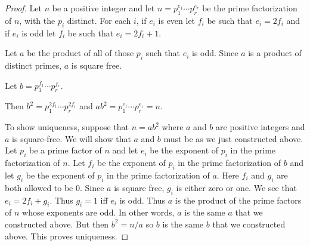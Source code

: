 \documentclass[oneside,12pt]{amsart}
\begin{document}
\begin{proof}
Let $n$ be a positive integer and let $n=p_1^{e_1}\cdots p_r^{e_r}$
be the prime factorization of $n$, with the $p_i$ distinct. For each $i$,
if $e_i$ is even let $f_i$ be such that $e_i=2f_i$ and if $e_i$ is odd
let $f_i$ be such that $e_i=2f_i + 1$.

Let $a$ be the product of all of those $p_i$ such that $e_i$ is odd. Since
$a$ is a product of distinct primes, $a$ is square free.

Let $b=p_1^{f_1}\cdots p_r^{f_r}$.

Then $b^2=p_1^{2f_1}\cdots p_r^{2f_r}$ and 
$ab^2=p_1^{e_1}\cdots p_r^{e_r} = n$.

To show uniqueness, suppose that $n=ab^2$ where $a$ and $b$ are positive integers and $a$ is square-free. We will show that $a$ and $b$ must be as we just constructed above. Let $p_i$ be a prime factor of $n$ and let $e_i$ be the exponent of $p_i$ in the prime factorization of $n$. Let $f_i$ be the exponent of $p_i$ in the prime factorization of $b$ and let $g_i$ be the exponent of $p_i$ in the prime factorization of $a$. Here $f_i$ and $g_i$ are both allowed to be 0. Since $a$ is square free, $g_i$ is either zero or one.
We see that $e_i = 2f_i + g_i$.  Thus $g_i=1$ iff $e_i$ is odd. Thus $a$ is
the product of the prime factors of $n$ whose exponents are odd. In
other words, $a$ is the same $a$ that we constructed above. But then $b^2=n/a$ so $b$ is the same $b$ that we constructed above. This proves uniqueness.
\end{proof}
\end{document}
